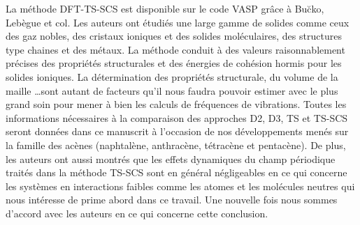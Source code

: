 La méthode DFT-TS-SCS est disponible sur le code VASP grâce à Bu\u{c}ko, Lebègue et col\cite{buvcko2013tkatchenko}. Les auteurs ont étudiés une large gamme de solides comme ceux des gaz nobles, des cristaux ioniques et des solides moléculaires, des structures type chaines et des métaux. La méthode conduit à des valeurs raisonnablement précises des propriétés structurales et des énergies de cohésion hormis pour les solides ioniques. La détermination des propriétés structurale, du volume de la maille \dots sont autant de facteurs qu’il nous faudra pouvoir estimer avec le plus grand soin pour mener à bien les calculs de fréquences de vibrations. Toutes les informations nécessaires à la comparaison des approches D2, D3, TS et TS-SCS seront données dans ce manuscrit à l’occasion de nos développements menés sur la famille des acènes (naphtalène, anthracène, tétracène et pentacène). De plus, les auteurs ont aussi montrés que les effets dynamiques du champ périodique traités dans la méthode TS-SCS sont en général négligeables en ce qui concerne les systèmes en interactions faibles comme les atomes et les molécules neutres qui nous intéresse de prime abord dans ce travail. Une nouvelle fois nous sommes d’accord avec les auteurs en ce qui concerne cette conclusion.














